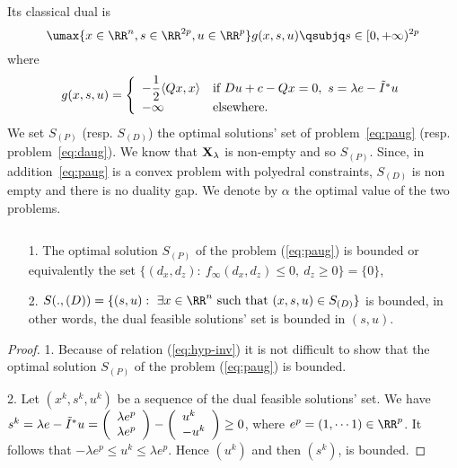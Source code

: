 Its classical dual is
\begin{equation}
\label{eq:daug}
\umax{x\in\RR^n, s\in\RR^{2p}, u\in\RR^p}
g(x,s,u)
\qsubjq s\in[0,+\infty)^{2p}
\end{equation}
where 
$$g(x,s,u)=\left\{\begin{array}{ll}
-\displaystyle{1\over 2}\langle Qx,x\rangle&\mbox{if }{D} u+c-Qx=0,\ s=\lambda e-{\tilde I}^*u\cr 
-\infty&\mbox{elsewhere.}\end{array}\right.$$ 
We set $S_{(P)}$ (resp. $S_{(D)}$) the optimal solutions' set of
problem~\cref{eq:paug} (resp. problem~\cref{eq:daug}).
We know that $\mathbf{X}_{\lambda}$ is non-empty and so $S_{(P)}$.
Since, in addition~\cref{eq:paug} is a convex problem with polyedral constraints, $S_{(D)}$ is non empty and there is no duality gap. We denote by $\alpha$ the optimal value of the two problems. 

\begin{proposition}\label{dcompacity}{$ $}

\begin{itemize}
\item[1.]The optimal solution $S_{(P)}$ of the problem (\ref{eq:paug}) is bounded or equivalently the set $\{(d_x,d_z):\ f_\infty(d_x,d_z)\leq0,\ d_z\geq0\}=\{0\}$,
\item[2.]$S(.,(D))=\{(s,u):\ \exists x\in\RR^n\mbox{ such that }(x,s,u)\in S_{(D)}\}$ is bounded, in other words, the dual feasible solutions' set is bounded in $(s,u)$.
\end{itemize}
\end{proposition}
\begin{proof}
1. Because of relation (\ref{eq:hyp-inv}) it is not difficult to show that the optimal solution $S_{(P)}$ of the problem (\ref{eq:paug}) is bounded.


2. Let $(x^k,s^k,u^k)$ be a sequence of the dual feasible solutions' set. We have $s^k=\lambda e-{\tilde I}^*u=\left(\begin{array}{l}\lambda e^p\cr\lambda e^p\end{array}\right)-\left(\begin{array}{l}u^k\cr-u^k\end{array}\right)\geq0$, where $e^p=(1,\cdots 1)\in\RR^p$. It follows that $-\lambda e^p\leq u^k\leq \lambda e^p$. Hence $(u^k)$ and then $(s^k)$, is bounded.
\end{proof}





